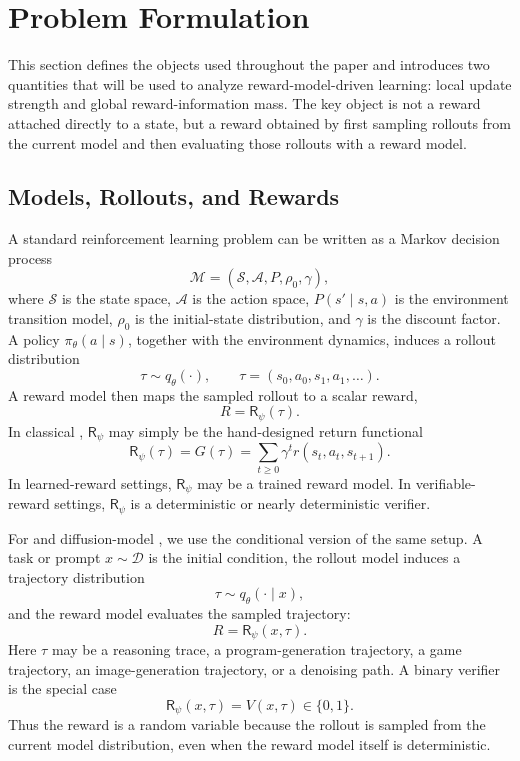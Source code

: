 \section{Problem Formulation}

This section defines the objects used throughout the paper and introduces two quantities that will be used to analyze reward-model-driven learning: local update strength and global reward-information mass. The key object is not a reward attached directly to a state, but a reward obtained by first sampling rollouts from the current model and then evaluating those rollouts with a reward model.

\subsection{Models, Rollouts, and Rewards}

A standard reinforcement learning problem can be written as a Markov decision process
\[
  \mathcal{M}=(\mathcal{S},\mathcal{A},P,\rho_0,\gamma),
\]
where $\mathcal{S}$ is the state space, $\mathcal{A}$ is the action space, $P(s'\mid s,a)$ is the environment transition model, $\rho_0$ is the initial-state distribution, and $\gamma$ is the discount factor. A policy $\pi_\theta(a\mid s)$, together with the environment dynamics, induces a rollout distribution
\[
  \tau \sim q_\theta(\cdot),
  \qquad
  \tau=(s_0,a_0,s_1,a_1,\ldots).
\]
A reward model then maps the sampled rollout to a scalar reward,
\[
  R = \mathsf{R}_\psi(\tau).
\]
In classical \rl{}, $\mathsf{R}_\psi$ may simply be the hand-designed return functional
\[
  \mathsf{R}_\psi(\tau)=G(\tau)=\sum_{t\ge 0}\gamma^t r(s_t,a_t,s_{t+1}).
\]
In learned-reward settings, $\mathsf{R}_\psi$ may be a trained reward model. In verifiable-reward settings, $\mathsf{R}_\psi$ is a deterministic or nearly deterministic verifier.

For \llm{} and diffusion-model \rlvr{}, we use the conditional version of the same setup. A task or prompt $x\sim \mathcal{D}$ is the initial condition, the rollout model induces a trajectory distribution
\[
  \tau \sim q_\theta(\cdot\mid x),
\]
and the reward model evaluates the sampled trajectory:
\[
  R=\mathsf{R}_\psi(x,\tau).
\]
Here $\tau$ may be a reasoning trace, a program-generation trajectory, a game trajectory, an image-generation trajectory, or a denoising path. A binary verifier is the special case
\[
  \mathsf{R}_\psi(x,\tau)=V(x,\tau)\in\{0,1\}.
\]
Thus the reward is a random variable because the rollout is sampled from the current model distribution, even when the reward model itself is deterministic.

